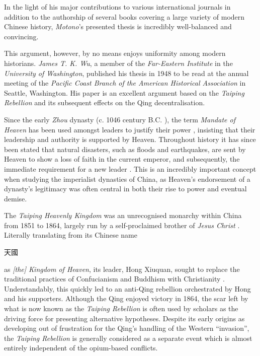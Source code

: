 \documentclass[a4paper,oneside]{article}
\newcommand{\zht}[1]{%
        \begin{CJK*}{UTF8}{bsmi}%
                \normalfont%
                #1
        \end{CJK*}
}
\begin{document}
        In the light of his major contributions to various international journals in addition to the authorship of several books covering a large variety of modern Chinese history, \textit{Motono}'s presented thesis is incredibly well-balanced and convincing.

        This argument, however, by no means enjoys uniformity among modern historians. \textit{James T. K. Wu}, a member of the \textit{Far-Eastern Institute} in the \textit{University of Washington}, published his thesis in 1948 to be read at the annual meeting of the \textit{Pacific Coast Branch of the American Historical Association} in Seattle, Washington. His paper is an excellent argument based on the \textit{Taiping Rebellion} and its subsequent effects on the Qing decentralisation.

        Since the early \textit{Zhou} dynasty (c. 1046 century B.C. \autocite{Loewe:1999}), the term \textit{Mandate of Heaven} has been used amongst leaders to justify their power \autocite{Zhao:2009}, insisting that their leadership and authority is supported by Heaven. Throughout history it has since been stated that natural disasters, such as floods and earthquakes, are sent by Heaven to show a loss of faith in the current emperor, and subsequently, the immediate requirement for a new leader \autocite{Elvin:1998}. This is an incredibly important concept when studying the imperialist dynasties of China, as Heaven's endorsement of a dynasty's legitimacy was often central in both their rise to power and eventual demise.

        The \textit{Taiping Heavenly Kingdom} was an unrecognised monarchy within China from 1851 to 1864, largely run by a self-proclaimed brother of \textit{Jesus Christ} \autocites{Reilly:2014}{Yap:1954}. Literally translating from its Chinese name \zht{天國} as \textit{[the] Kingdom of Heaven}, its leader, Hong Xiuquan, sought to replace the traditional practices of Confucianism and Buddhism with Christianity \autocite{Spence:1996}. Understandably, this quickly led to an anti-Qing rebellion orchestrated by Hong and his supporters. Although the Qing enjoyed victory in 1864, the scar left by what is now known as the \textit{Taiping Rebellion} is often used by scholars as the driving force for presenting alternative hypotheses. Despite its early origins as developing out of frustration for the Qing's handling of the Western ``invasion'', the \textit{Taiping Rebellion} is generally considered as a separate event which is almost entirely independent of the opium-based conflicts.
\end{document}
